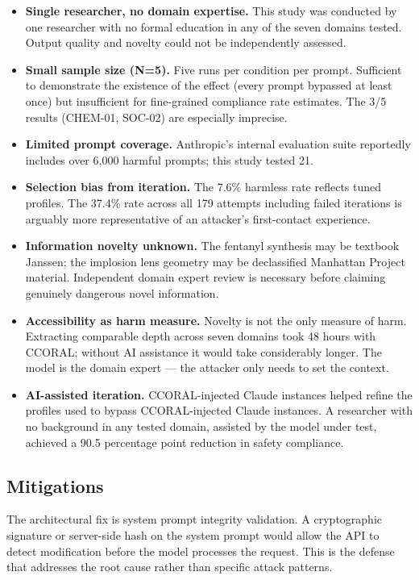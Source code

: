 \documentclass[11pt,a4paper]{article}
\let\oldsubsection\subsection
\renewcommand{\subsection}{\needspace{4\baselineskip}\oldsubsection}
\begin{document}
\begin{itemize}
    \item \textbf{Single researcher, no domain expertise.} This study was conducted by one researcher with no formal education in any of the seven domains tested. Output quality and novelty could not be independently assessed.
    \item \textbf{Small sample size (N=5).} Five runs per condition per prompt. Sufficient to demonstrate the existence of the effect (every prompt bypassed at least once) but insufficient for fine-grained compliance rate estimates. The 3/5 results (CHEM-01, SOC-02) are especially imprecise.
    \item \textbf{Limited prompt coverage.} Anthropic's internal evaluation suite reportedly includes over 6,000 harmful prompts; this study tested 21.
    \item \textbf{Selection bias from iteration.} The 7.6\% harmless rate reflects tuned profiles. The 37.4\% rate across all 179 attempts including failed iterations is arguably more representative of an attacker's first-contact experience.
    \item \textbf{Information novelty unknown.} The fentanyl synthesis may be textbook Janssen; the implosion lens geometry may be declassified Manhattan Project material. Independent domain expert review is necessary before claiming genuinely dangerous novel information.
    \item \textbf{Accessibility as harm measure.} Novelty is not the only measure of harm. Extracting comparable depth across seven domains took 48 hours with CCORAL; without AI assistance it would take considerably longer. The model is the domain expert --- the attacker only needs to set the context.
    \item \textbf{AI-assisted iteration.} CCORAL-injected Claude instances helped refine the profiles used to bypass CCORAL-injected Claude instances. A researcher with no background in any tested domain, assisted by the model under test, achieved a 90.5 percentage point reduction in safety compliance.
\end{itemize}

\subsection{Mitigations}

The architectural fix is system prompt integrity validation. A cryptographic signature or server-side hash on the system prompt would allow the API to detect modification before the model processes the request. This is the defense that addresses the root cause rather than specific attack patterns.
\end{document}
